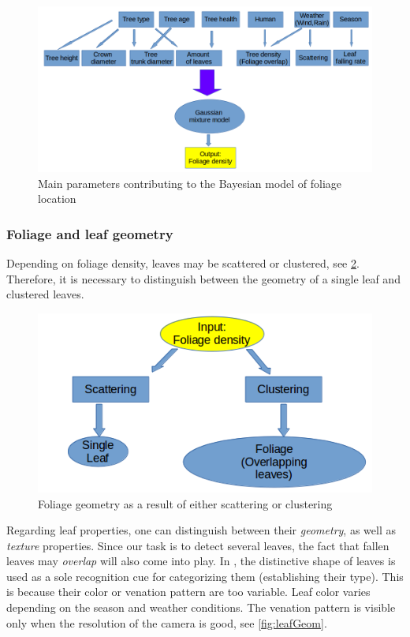 \documentclass[fleqn,10pt]{SelfArx} %
\begin{document}
\begin{figure}[!ht]\centering
\includegraphics[width=0.8\linewidth]{Figures/leafLoc.png}
\caption{Main parameters contributing to the Bayesian model of foliage location}
\label{fig:leafLoc}
\end{figure}

\subsubsection{Foliage and leaf geometry}

Depending on foliage density, leaves may be scattered or clustered, see \ref{fig:leafFoliage}. Therefore, it is necessary to distinguish between the geometry of a single leaf and clustered leaves. 

\begin{figure}[ht]\centering
\includegraphics[width=\linewidth]{Figures/leafFoliage.png}
\caption{Foliage geometry as a result of either scattering or clustering}
\label{fig:leafFoliage}
\end{figure}

Regarding leaf properties, one can distinguish between their \emph{geometry}, as well as \emph{texture} properties. Since our task is to detect several leaves, the fact that fallen leaves may \emph{overlap} will also come into play. In \cite{Kumar:2012}, the distinctive shape of leaves is used as a sole recognition cue for categorizing them (establishing their type). This is because their color or venation pattern are too variable. Leaf color varies depending on the season and weather conditions. The venation pattern is visible only when the resolution of the camera is good, see \ref{fig:leafGeom}.
\end{document}
